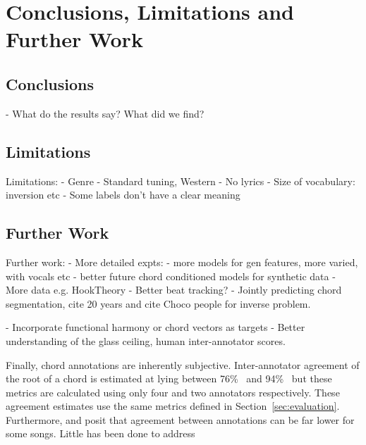 
\chapter{Conclusions, Limitations and Further Work}

\section{Conclusions}

- What do the results say? What did we find?

\section{Limitations}
Limitations:
- Genre
- Standard tuning, Western
- No lyrics
- Size of vocabulary: inversion etc
- Some labels don't have a clear meaning

\section{Further Work}
Further work:
- More detailed expts:
    - more models for gen features, more varied, with vocals etc
    - better future chord conditioned models for synthetic data
- More data e.g. HookTheory
- Better beat tracking?
- Jointly predicting chord segmentation, cite 20 years and cite Choco people for inverse problem.

- Incorporate functional harmony or chord vectors as targets
- Better understanding of the glass ceiling, human inter-annotator scores.

Finally, chord annotations are inherently subjective. Inter-annotator agreement of the root of a chord is estimated at lying between 76\%~\citep{AnnotatorAgreement76} and 94\%~\citep{RockHarmonyAnalysis94} but these metrics are calculated using only four and two annotators respectively. These agreement estimates use the same metrics defined in Section~\ref{sec:evaluation}. Furthermore, \citet{FourTimelyInsights} and \citet{UnderstandingSubjectivity} posit that agreement between annotations can be far lower for some songs. Little has been done to address